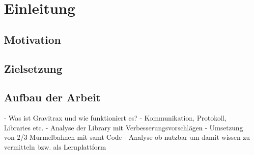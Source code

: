 \chapter{Einleitung}

\section{Motivation}
\lipsum[1]

\section{Zielsetzung}
\lipsum[2]

\section{Aufbau der Arbeit}
\lipsum[3]

- Was ist Gravitrax und wie funktioniert es?
    - Kommunikation, Protokoll, Libraries etc.
- Analyse der Library mit Verbesserungsvorschlägen
- Umsetzung von 2/3 Murmelbahnen mit samt Code
- Analyse ob nutzbar um damit wissen zu vermitteln bzw. als Lernplattform